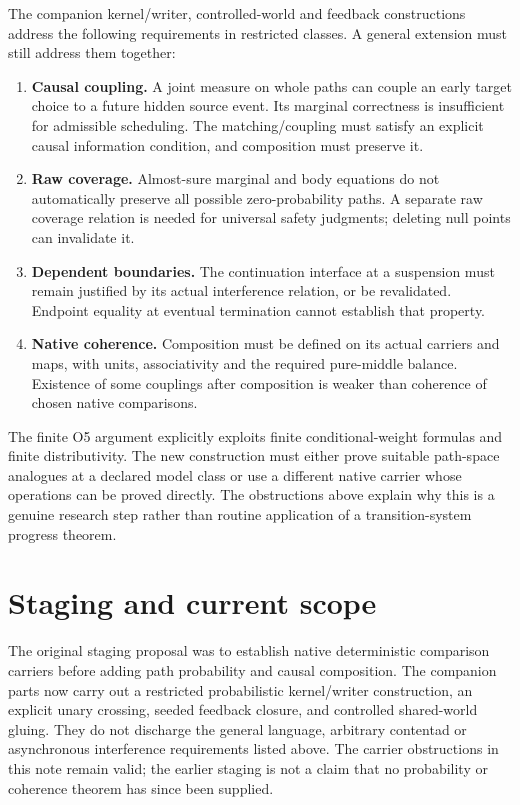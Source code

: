 \documentclass[11pt]{article}
\begin{document}
The companion kernel/writer, controlled-world and feedback constructions address the following requirements in restricted classes. A general extension must still address them together:
\begin{enumerate}
\item \textbf{Causal coupling.} A joint measure on whole paths can couple an early target choice to a future hidden source event. Its marginal correctness is insufficient for admissible scheduling. The matching/coupling must satisfy an explicit causal information condition, and composition must preserve it.
\item \textbf{Raw coverage.} Almost-sure marginal and body equations do not automatically preserve all possible zero-probability paths. A separate raw coverage relation is needed for universal safety judgments; deleting null points can invalidate it.
\item \textbf{Dependent boundaries.} The continuation interface at a suspension must remain justified by its actual interference relation, or be revalidated. Endpoint equality at eventual termination cannot establish that property.
\item \textbf{Native coherence.} Composition must be defined on its actual carriers and maps, with units, associativity and the required pure-middle balance. Existence of some couplings after composition is weaker than coherence of chosen native comparisons.
\end{enumerate}
The finite O5 argument explicitly exploits finite conditional-weight formulas and finite distributivity. The new construction must either prove suitable path-space analogues at a declared model class or use a different native carrier whose operations can be proved directly. The obstructions above explain why this is a genuine research step rather than routine application of a transition-system progress theorem.

\section{Staging and current scope}
The original staging proposal was to establish native deterministic comparison carriers before adding path probability and causal composition. The companion parts now carry out a restricted probabilistic kernel/writer construction, an explicit unary crossing, seeded feedback closure, and controlled shared-world gluing. They do not discharge the general language, arbitrary contentad or asynchronous interference requirements listed above. The carrier obstructions in this note remain valid; the earlier staging is not a claim that no probability or coherence theorem has since been supplied.
\end{document}
